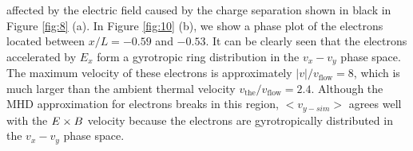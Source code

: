 \documentclass[draft,jgrga]{agutex2015}
\begin{document}
\begin{article}
affected by the electric field caused by the charge separation
shown in black in Figure \ref{fig:8} (a).
In Figure \ref{fig:10} (b), we show a phase plot of the electrons located between 
$x/L = -0.59$ and $-0.53$.
It can be clearly seen that the electrons accelerated by $E_x$ form 
a gyrotropic ring distribution in the $v_x-v_y$ phase space.
The maximum velocity of these electrons is approximately 
$|v|/v_\mathrm{flow} = 8$, which is much larger than 
the ambient thermal velocity $v_{\mathrm{the}}/v_\mathrm{flow} = 2.4$. 
%
Although the MHD approximation for electrons breaks in this region, 
$<v_{y-sim}>$ agrees well with 
the $\mbox{\boldmath $E$} \times \mbox{\boldmath $B$}$ velocity
because the electrons are gyrotropically 
distributed in the $v_x-v_y$ phase space.



\end{article}
\end{document}
